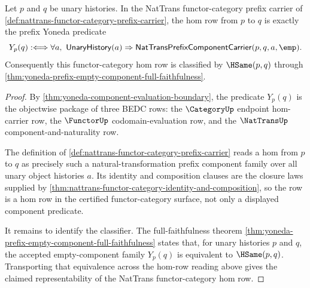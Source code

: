 \begin{theorem}
\label{thm:yoneda-nattrans-functor-category-hom-representability}
Let $p$ and $q$ be unary histories. In the NatTrans functor-category prefix
carrier of \autoref{def:nattrans-functor-category-prefix-carrier}, the hom row
from $p$ to $q$ is exactly the prefix Yoneda predicate
$$
Y_p(q) :\Longleftrightarrow
\forall a,\ \mathsf{UnaryHistory}(a)\Rightarrow
\mathsf{NatTransPrefixComponentCarrier}(p,q,a,\emp).
$$
Consequently this functor-category hom row is classified by $\HSame(p,q)$
through
\autoref{thm:yoneda-prefix-empty-component-full-faithfulness}.
\end{theorem}
\begin{proof}
By \autoref{thm:yoneda-component-evaluation-boundary}, the predicate $Y_p(q)$
is the objectwise package of three BEDC rows: the $\CategoryUp$ endpoint
hom-carrier row, the $\FunctorUp$ codomain-evaluation row, and the $\NatTransUp$
component-and-naturality row.

The definition of
\autoref{def:nattrans-functor-category-prefix-carrier} reads a hom from $p$ to
$q$ as precisely such a natural-transformation prefix component family over all
unary object histories $a$. Its identity and composition clauses are the closure
laws supplied by
\autoref{thm:nattrans-functor-category-identity-and-composition}, so the row is
a hom row in the certified functor-category surface, not only a displayed
component predicate.

It remains to identify the classifier. The full-faithfulness theorem
\autoref{thm:yoneda-prefix-empty-component-full-faithfulness} states that, for
unary histories $p$ and $q$, the accepted empty-component family $Y_p(q)$ is
equivalent to $\HSame(p,q)$. Transporting that equivalence across the hom-row
reading above gives the claimed representability of the NatTrans
functor-category hom row.
\end{proof}

